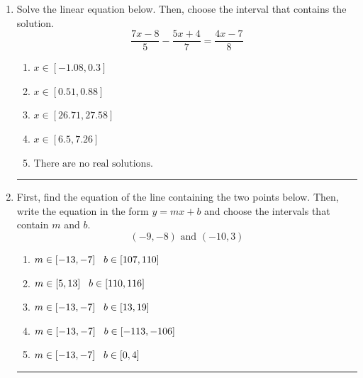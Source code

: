 \documentclass[14pt]{extbook}
\newcommand{\litem}[1]{\item#1\hspace*{-1cm}\rule{\textwidth}{0.4pt}}
\begin{document}
\begin{enumerate}
{\begin{enumerate}[label=\Alph*.]
\end{enumerate} }
\litem{
Solve the linear equation below. Then, choose the interval that contains the solution.\[ \frac{7x -8}{5} - \frac{5x + 4}{7} = \frac{4x -7}{8} \]\begin{enumerate}[label=\Alph*.]
\item \( x \in [-1.08, 0.3] \)
\item \( x \in [0.51, 0.88] \)
\item \( x \in [26.71, 27.58] \)
\item \( x \in [6.5, 7.26] \)
\item \( \text{There are no real solutions.} \)

\end{enumerate} }
\litem{
First, find the equation of the line containing the two points below. Then, write the equation in the form $ y=mx+b $ and choose the intervals that contain $m$ and $b$.\[ (-9, -8) \text{ and } (-10, 3) \]\begin{enumerate}[label=\Alph*.]
\item \( m \in [-13, -7] \hspace*{3mm} b \in [107, 110] \)
\item \( m \in [5, 13] \hspace*{3mm} b \in [110, 116] \)
\item \( m \in [-13, -7] \hspace*{3mm} b \in [13, 19] \)
\item \( m \in [-13, -7] \hspace*{3mm} b \in [-113, -106] \)
\item \( m \in [-13, -7] \hspace*{3mm} b \in [0, 4] \)


\end{enumerate}}
\end{enumerate}
\end{document}
